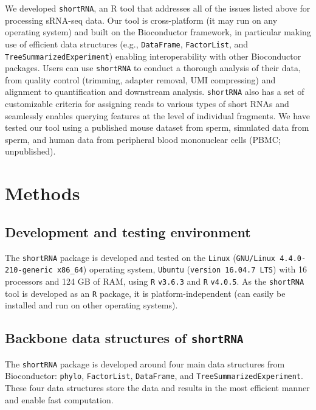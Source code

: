 \documentclass[12pt,twoside]{reedthesis}
\begin{document}
We developed \texttt{shortRNA}, an R tool that addresses all of the issues listed
above for processing sRNA-seq data. Our tool is cross-platform (it may
run on any operating system) and built on the Bioconductor framework, in
particular making use of efficient data structures (e.g., \texttt{DataFrame},
\texttt{FactorList}, and \texttt{TreeSummarizedExperiment}) enabling interoperability with
other Bioconductor packages. Users can use \texttt{shortRNA} to conduct a
thorough analysis of their data, from quality control (trimming, adapter
removal, UMI compressing) and alignment to quantification and downstream
analysis. \texttt{shortRNA} also has a set of customizable criteria for assigning
reads to various types of short RNAs and seamlessly enables querying
features at the level of individual fragments. We have tested our tool
using a published mouse dataset from sperm, simulated data from sperm,
and human data from peripheral blood mononuclear cells (PBMC;
unpublished).

\hypertarget{methods-2}{%
\section{Methods}\label{methods-2}}

\hypertarget{development-and-testing-environment}{%
\subsection{Development and testing environment}\label{development-and-testing-environment}}

The \texttt{shortRNA} package is developed and tested on the \texttt{Linux} (\texttt{GNU/Linux\ 4.4.0-210-generic\ x86\_64}) operating system, \texttt{Ubuntu} (\texttt{version\ 16.04.7\ LTS})
with 16 processors and 124 GB of RAM, using \texttt{R} \texttt{v3.6.3} and \texttt{R} \texttt{v4.0.5}. As the
\texttt{shortRNA} tool is developed as an \texttt{R} package, it is platform-independent
(can easily be installed and run on other operating systems).

\hypertarget{backbone-data-structures-of-shortrna}{%
\subsection{\texorpdfstring{Backbone data structures of \texttt{shortRNA}}{Backbone data structures of shortRNA}}\label{backbone-data-structures-of-shortrna}}

The \texttt{shortRNA} package is developed around four main data structures from
Bioconductor: \texttt{phylo}, \texttt{FactorList}, \texttt{DataFrame}, and
\texttt{TreeSummarizedExperiment}. These four data structures store the data and
results in the most efficient manner and enable fast computation.
\end{document}
